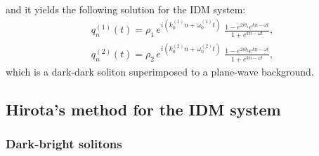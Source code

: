 \documentclass{article}
\begin{document}
and it yields the following solution for the IDM system:
\begin{equation}
\begin{split}
    q^{(1)}_n(t)=\rho_1\,e^{i(k_0^{(1)} n+\omega_0^{(1)} t)}\;\frac{1-e^{2i\theta_1}e^{k n-\omega t}}{1+e^{k n-\omega t}},\\
    q^{(2)}_n(t)=\rho_2\,e^{i(k_0^{(2)} n+\omega_0^{(2)} t)}\;\frac{1-e^{2i\theta_2}e^{k n-\omega t}}{1+e^{k n-\omega t}},
    \end{split}
\end{equation}
which is a dark-dark soliton superimposed to a plane-wave background.

\fi

\subsection{Hirota's method for the IDM system}



\subsubsection{Dark-bright solitons}
\end{document}
